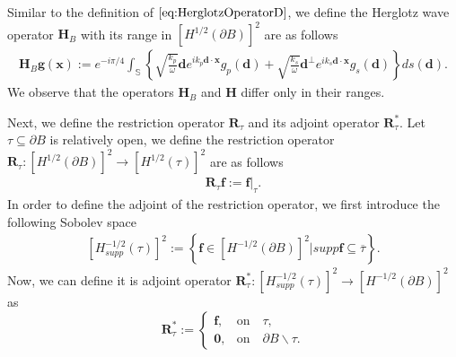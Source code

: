 \documentclass[11pt,reqno,twoside]{amsart}
\theoremstyle{definition}
\theoremstyle{remark}
\numberwithin{equation}{section}
\newcommand{\bmf}[1]{{\mathbf{#1}}}
\begin{document}
	Similar to the definition of $\eqref{eq:HerglotzOperatorD}$, we define the Herglotz wave operator $\mathbf H_B$ with its range in $\left[H^{1/2}\left(\partial B\right) \right] ^2$ are as follows
	\begin{align}\label{eq:HerglotzOperatorB}
		\mathbf H_B \mathbf g \left( \mathbf x\right) :=e^{-i\pi /4} \int_{\mathbb S}  \left\lbrace \sqrt{\frac{k_p}{\omega}}\mathbf{d} e^{ik_p\mathbf{d}\cdot\mathbf{x}}g_p(\mathbf{d})+\sqrt{\frac{k_s}{\omega}}\mathbf{d}^{\perp} e^{ik_s\mathbf{d}\cdot\mathbf{x}}g_s(\mathbf{d})\right\rbrace ds(\mathbf{d}).
	\end{align}
	We observe that the operators $\mathbf H_B$ and $\mathbf H$ differ only in their ranges.
	
   Next, we define the restriction operator $\mathbf R_{\tau}$ and its adjoint operator $\mathbf R^*_{\tau}$. Let $\tau \subseteq \partial B$ is relatively open, we define the restriction operator $\mathbf R_{\tau}:\left[H^{1/2}\left(\partial B\right) \right] ^2 \to \left[H^{1/2}\left(\tau \right) \right] ^2 $ are as follows
	\begin{align}\label{eq:RestrictionOperator}
	 \mathbf R_{\tau} \mathbf f:= \mathbf f|_{\tau}.
	\end{align}
	In order to define the adjoint of the restriction operator, we first introduce the following Sobolev space
	\begin{align}
		\left[H^{-1/2}_{supp}\left(\tau \right) \right] ^2:=\left\lbrace \mathbf f \in \left[H^{-1/2}\left(\partial B\right) \right] ^2 | supp \mathbf f \subseteq \overline{\tau}\right\rbrace .
	\end{align}
	Now, we can define it is adjoint operator $\mathbf R^*_{\tau}: \left[H^{-1/2}_{supp}\left(\tau \right) \right] ^2 \to \left[H^{-1/2}\left(\partial B\right) \right] ^2 $ as
	\begin{equation}\label{eq:RestrictionOperatorA}
		\mathbf R^*_{\tau}:=
		\begin{cases}
			\mathbf f,& \mbox{on}\quad \tau,\\
			\bmf 0, &  \mbox{on}\quad \partial B \backslash \tau .
		\end{cases}
	\end{equation}
	
\end{document}

